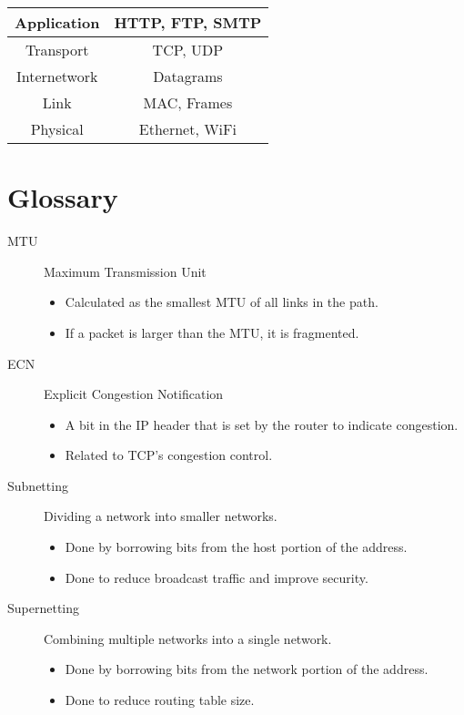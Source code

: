 \documentclass[8pt]{extarticle}
\begin{document}
\begin{tabular}{|c|c|}
  \hline
  Application  & HTTP, FTP, SMTP \\
  \hline
  Transport    & TCP, UDP        \\
  \hline
  Internetwork & Datagrams       \\
  \hline
  Link         & MAC, Frames     \\
  \hline
  Physical     & Ethernet, WiFi  \\
  \hline
\end{tabular}

\section*{Glossary}
\begin{description}
  \item[MTU]  Maximum Transmission Unit
        \begin{itemize}
          \item Calculated as the smallest MTU of all links in the path.
          \item If a packet is larger than the MTU, it is fragmented.
        \end{itemize}
  \item [ECN] Explicit Congestion Notification
        \begin{itemize}
          \item A bit in the IP header that is set by the router to indicate congestion.
          \item Related to TCP's congestion control.
        \end{itemize}
  \item [Subnetting] Dividing a network into smaller networks.
        \begin{itemize}
          \item Done by borrowing bits from the host portion of the address.
          \item Done to reduce broadcast traffic and improve security.
        \end{itemize}
  \item [Supernetting] Combining multiple networks into a single network.
        \begin{itemize}
          \item Done by borrowing bits from the network portion of the address.
          \item Done to reduce routing table size.
        \end{itemize}
\end{description}
\end{document}
